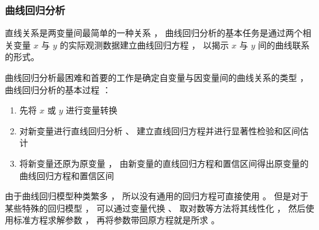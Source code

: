 \documentclass[dvipsnames, svgnames, x11names]{beamer}
\begin{document}
\begin{frame}
    \frametitle{曲线回归分析}
    直线关系是两变量间最简单的一种关系 ， 曲线回归分析的基本任务是通过两个相关变量 $x$ 与 $y$ 的实际观测数据建立曲线回归方程 ， 以揭示 $x$ 与 $y$ 间的曲线联系的形式。

    曲线回归分析最困难和首要的工作是确定自变量与因变量间的曲线关系的类型 ， 曲线回归分析的基本过程 ：

    \begin{enumerate}
      \item 先将 $x$ 或 $y$ 进行变量转换
      \item 对新变量进行直线回归分析 、 建立直线回归方程并进行显著性检验和区间估计
      \item 将新变量还原为原变量 ， 由新变量的直线回归方程和置信区间得出原变量的曲线回归方程和置信区间
    \end{enumerate}

    由于曲线回归模型种类繁多 ， 所以没有通用的回归方程可直接使用 。 但是对于某些特殊的回归模型 ， 可以通过变量代换 、 取对数等方法将其线性化 ， 然后使用标准方程求解参数 ， 再将参数带回原方程就是所求 。
\end{frame}
\end{document}
